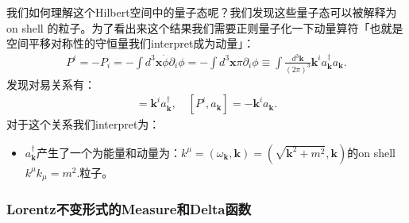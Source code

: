 \bigskip
{}

我们如何理解这个Hilbert空间中的量子态呢？我们发现这些量子态可以被解释为on shell
的粒子。为了看出来这个结果我们需要正则量子化一下动量算符「也就是空间平移对称性的守恒量我们interpret成为动量」：
\begin{align}
  P^i=-P_i=-\int d^3\mathbf{x}\dot{\phi}\partial_i\phi=-\int
  d^3\mathbf{x}\pi\partial_i\phi\equiv\int\frac{d^3\mathbf{k}}{(2\pi)^3}\mathbf{k}^ia_\mathbf{k}^\dagger
  a_\mathbf{k}.
\end{align}
发现对易关系有：
\begin{align}
  [P^i,a_{\mathbf{k}}^\dagger]=\mathbf{k}^ia_{\mathbf{k}}^\dagger,\quad
  [P^i,a_{\mathbf{k}}]=-\mathbf{k}^ia_{\mathbf{k}}.
\end{align}
对于这个关系我们interpret为：
\begin{itemize}
  \item $ a_\mathbf{k}^\dagger $产生了一个为能量和动量为：$
    k^\mu=(\omega_\mathbf{k},\mathbf{k})=(\sqrt{\mathbf{k}^2+m^2},\mathbf{k})
    $的on shell $ k^\mu k_\mu=m^2. $粒子。
\end{itemize}


\subsubsection{Lorentz不变形式的Measure和Delta函数}

